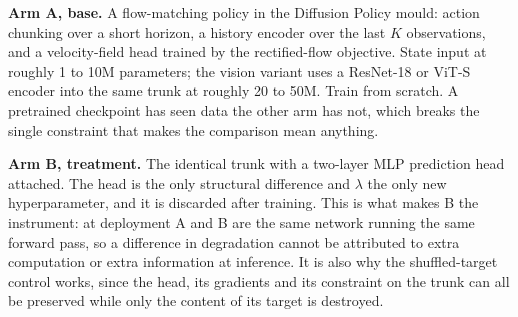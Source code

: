 \documentclass[9pt]{extarticle}
\begin{document}
\begin{center}
\end{center}

\textbf{Arm A, base.} A flow-matching policy in the Diffusion Policy mould: action chunking over a short horizon, a history encoder over the last $K$ observations, and a velocity-field head trained by the rectified-flow objective. State input at roughly 1 to 10M parameters; the vision variant uses a ResNet-18 or ViT-S encoder into the same trunk at roughly 20 to 50M. Train from scratch. A pretrained checkpoint has seen data the other arm has not, which breaks the single constraint that makes the comparison mean anything.

\textbf{Arm B, treatment.} The identical trunk with a two-layer MLP prediction head attached. The head is the only structural difference and $\lambda$ the only new hyperparameter, and it is discarded after training. This is what makes B the instrument: at deployment A and B are the same network running the same forward pass, so a difference in degradation cannot be attributed to extra computation or extra information at inference. It is also why the shuffled-target control works, since the head, its gradients and its constraint on the trunk can all be preserved while only the content of its target is destroyed.
\end{document}
